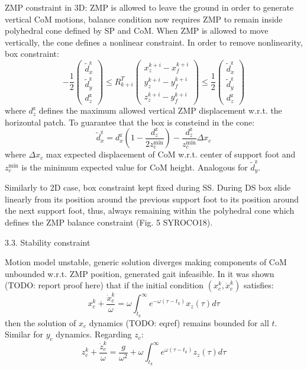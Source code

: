 ZMP constraint in 3D:
ZMP is allowed to leave the ground in order to generate vertical CoM motions,
balance condition now requires ZMP to remain inside polyhedral cone defined 
by SP and CoM. When ZMP is allowed to move vertically, the cone defines a 
nonlinear constraint. In order to remove nonlinearity, box constraint:
\begin{equation}
  \label{eq:zmp-constraint-3d}
  -\frac{1}{2}
  \begin{pmatrix}
    \tilde{d}_x^\text{z} \\
    \tilde{d}_y^\text{z} \\
    d_z^\text{z}
  \end{pmatrix}
  \le
  R_{k+i}^T
  \begin{pmatrix}
    x_z^{k+i} - x_f^{k+i} \\
    y_z^{k+i} - y_f^{k+i} \\
    z_z^{k+i} - y_f^{k+i}
  \end{pmatrix}
  \le
  \frac{1}{2}
  \begin{pmatrix}
    \tilde{d}_x^\text{z} \\
    \tilde{d}_y^\text{z} \\
    d_z^\text{z}
  \end{pmatrix}
\end{equation}
where $d_z^\text{z}$ defines the maximum allowed vertical ZMP displacement
w.r.t. the horizontal patch. To guarantee that the box is consteind in the cone:
\begin{equation}
  \tilde{d}_x^\text{z} = d_x^\text{z} \left( 1 -
      \frac{d_z^\text{z}}{2z_c^{\min}} \right)
      - \frac{d_z^\text{z}}{z_c^{\min}}\Delta x_c
\end{equation}
where $\Delta x_c$ max expected displacement of CoM w.r.t. center of support 
foot and $z_c^{\min}$ is the minimum expected value for CoM height.
Analogous for $\tilde{d}_y^\text{z}$.

Similarly to 2D case, box constraint kept fixed during SS. During DS box 
slide linearly from its position around the previous support foot to its 
position around the next support foot, thus, always remaining within the 
polyhedral cone which defines the ZMP balance constraint (Fig. 5 SYROCO18).

3.3. Stability constraint

Motion model unstable, generic solution diverges making components of CoM 
unbounded w.r.t. ZMP position, generated gait infeasible.
In \cite{DBLP:conf/humanoids/SciancaCSLO16} it was shown (TODO: report proof 
here) that if the initial condition $(x_c^k, \dot{x}_c^k)$ satisfies:
\begin{equation}
  \label{eq:stability-condition-xc}
  x_c^k + \frac{\dot{x}_c^k}{\omega} = \omega \int_{t_k}^\infty 
      e^{-\omega(\tau-t_k)}x_z(\tau)d\tau
\end{equation}
then the solution of $x_c$ dynamics (TODO: eqref) remains bounded for all
$t$. Similar for $y_c$ dynamics. Regarding $z_c$:
\begin{equation}
  \label{eq:stability-condition-zc}
  z_c^k + \frac{\dot{z}_c^k}{\omega} = \frac{g}{\omega^2} +
      \omega \int_{t_k}^\infty e^{\omega(\tau-t_k)}z_z(\tau)d\tau
\end{equation}

